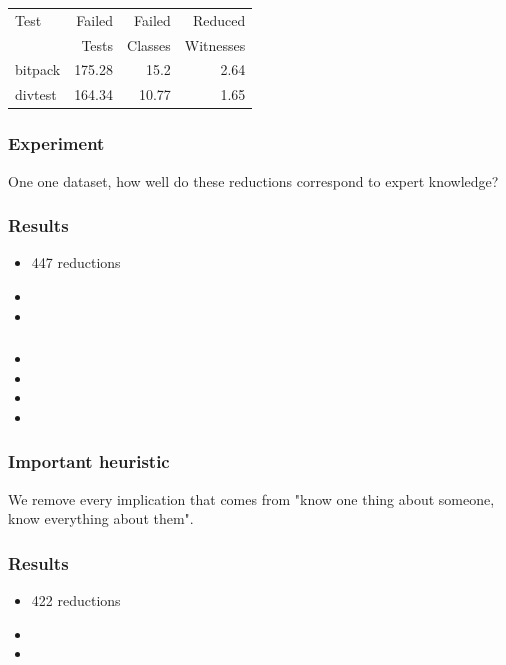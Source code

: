 \documentclass[svgnames,14pt]{beamer}
\theoremstyle{definition}
\begin{document}
\begin{frame}

\end{frame}

\begin{frame}
\def\?{\phantom0}
\centering
\begin{tabular}{ | l | r | r | r |}
\hline
Test & Failed & Failed  & Reduced \\
     & Tests  & Classes & Witnesses \\
\hline
bitpack & 175.28 & 15.2 & 2.64\\
divtest & 164.34 & 10.77 & 1.65\\
\hline
\end{tabular}
\end{frame}

\begin{frame}
\frametitle{Experiment}
One one dataset, how well do these reductions correspond to expert knowledge?
\end{frame}

\begin{frame}
\frametitle{Results}
\begin{itemize}
\item 447 reductions
\item {}
\item {}
\end{itemize}
\end{frame}

\begin{frame}
\frametitle{}
\begin{itemize}
\item {}
\item {}
\item {}
\item {}
\end{itemize}
\end{frame}

\begin{frame}
\frametitle{Important heuristic}
We remove every implication that comes from "know one thing about someone, know everything about them".
\end{frame}

\begin{frame}
\frametitle{Results}
\begin{itemize}
\item 422 reductions
\item {} 
\item {}
\end{itemize}
\end{frame}
\end{document}
